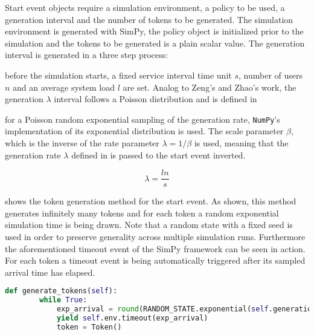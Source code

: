 \documentclass{seal_thesis}
\begin{document}
Start event objects require a simulation environment, a policy to be used, a generation interval and the number of tokens to be generated. The simulation environment is generated with SimPy, the policy object is initialized prior to the simulation and the tokens to be generated is a plain scalar value. The generation interval is generated in a three step process:
\begin{enumerate*}
 	\item before the simulation starts, a fixed service interval time unit $s$, number of users $n$ and an average system load $l$ are set. Analog to Zeng's and Zhao's work, the generation $\lambda$ interval follows a Poisson distribution \cite{Zeng2005} and is defined in 
 	\item for a Poisson random exponential sampling of the generation rate, \texttt{NumPy}'s implementation of its exponential distribution is used. The scale parameter $\beta$, which is the inverse of the rate parameter $\lambda = 1/\beta$ is used, meaning that the generation rate $\lambda$ defined in  is passed to the start event inverted.
 \end{enumerate*}

\begin{equation}
\label{eq:generation_interval}
	\lambda = \frac{l n}{s}
\end{equation}

 shows the token generation method for the start event. As shown, this method generates infinitely many tokens and for each token a random exponential simulation time is being drawn. Note that a random state with a fixed seed is used in order to preserve generality across multiple simulation runs. Furthermore the aforementioned timeout event of the SimPy framework can be seen in action. For each token a timeout event is being automatically triggered after its sampled arrival time has elapsed.

\begin{lstlisting}[caption=Token generation method for start event object,label=lst:generate_tokens,language=Python]
    def generate_tokens(self):
        while True:
            exp_arrival = round(RANDOM_STATE.exponential(self.generation_interval), 1)
            yield self.env.timeout(exp_arrival)
            token = Token()
\end{lstlisting}
\end{document}
